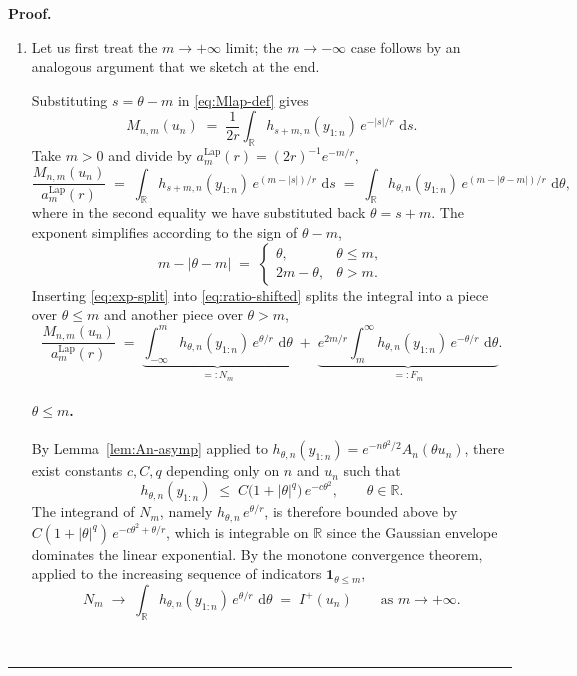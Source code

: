 \documentclass{article}%
\newenvironment{proof}[1][Proof]{\noindent\textbf{#1.} }{\ \rule{0.5em}{0.5em}}
\newcommand{\dd}{\,\mathrm{d}}
\newcommand{\Lap}{\mathrm{Lap}}
\newcommand{\1}{\mathbf{1}}
\begin{document}
\begin{proof}
\begin{enumerate}
    \item[(a)] Let us first treat the $m\to+\infty$ limit; the $m\to-\infty$ case follows by an
analogous argument that we sketch at the end.

Substituting $s = \theta - m$ in \eqref{eq:Mlap-def} gives
\begin{equation}\label{eq:Mlap-shifted}
  M_{n,m}(u_n)
  \;=\;\frac{1}{2r}\int_\mathbb{R} h_{s+m,n}(y_{1:n})\,e^{-|s|/r}\,\dd s.
\end{equation}
Take $m>0$ and divide by $a_m^{\Lap}(r) = (2r)^{-1}e^{-m/r}$,
\begin{equation}\label{eq:ratio-shifted}
  \frac{M_{n,m}(u_n)}{a_m^{\Lap}(r)}
  \;=\;\int_\mathbb{R} h_{s+m,n}(y_{1:n})\,e^{(m-|s|)/r}\,\dd s
  \;=\;\int_\mathbb{R} h_{\theta,n}(y_{1:n})\,e^{(m-|\theta-m|)/r}\,\dd\theta,
\end{equation}
where in the second equality we have substituted back $\theta = s+m$.
The exponent simplifies according to the sign of $\theta-m$,
\begin{equation}\label{eq:exp-split}
  m - |\theta-m|
  \;=\;
  \begin{cases}
    \theta, & \theta \leq m,\\[2pt]
    2m-\theta, & \theta > m.
  \end{cases}
\end{equation}
Inserting \eqref{eq:exp-split} into \eqref{eq:ratio-shifted} splits the
integral into a piece over $\theta\leq m$ and another piece over $\theta>m$,
\begin{equation}\label{eq:two-pieces}
  \frac{M_{n,m}(u_n)}{a_m^{\Lap}(r)}
  \;=\;\underbrace{\int_{-\infty}^m h_{\theta,n}(y_{1:n})\,e^{\theta/r}\,\dd\theta}_{=:N_m}
  \;+\;\underbrace{e^{2m/r}\int_m^\infty h_{\theta,n}(y_{1:n})\,e^{-\theta/r}\,\dd\theta}_{=:F_m}.
\end{equation}

\paragraph{$\theta \leq m$.} \quad
By Lemma~\ref{lem:An-asymp} applied to $h_{\theta,n}(y_{1:n})
= e^{-n\theta^2/2}A_n(\theta u_n)$, there exist constants
$c, C, q$ depending only on $n$ and $u_n$ such that
\begin{equation}\label{eq:h-env}
  h_{\theta,n}(y_{1:n})
  \;\leq\; C\bigl(1+|\theta|^q\bigr)\,e^{-c\theta^2},
  \qquad \theta\in\mathbb{R}.
\end{equation}
The integrand of $N_m$, namely $h_{\theta,n}\,e^{\theta/r}$, is
therefore bounded above by $C(1+|\theta|^q)\,e^{-c\theta^2+\theta/r}$,
which is integrable on $\mathbb{R}$ since the Gaussian envelope dominates the linear exponential. By the monotone convergence theorem, applied to
the increasing sequence of indicators $\1_{\theta\leq m}$,
\begin{equation}\label{eq:near-limit}
  N_m \;\longrightarrow\;\int_\mathbb{R} h_{\theta,n}(y_{1:n})\,e^{\theta/r}\,\dd\theta
  \;=\;I^+(u_n)
  \qquad\text{as }m\to+\infty.
\end{equation}


\end{enumerate}
\end{proof}
\end{document}
